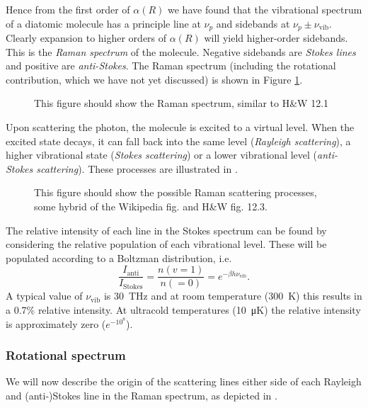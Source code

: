Hence from the first order of $\alpha(R)$ we have found that the vibrational
spectrum of a diatomic molecule has a principle line at $\nu_p$ and sidebands at
$\nu_p \pm \nu_\text{vib}$. Clearly expansion to higher orders of $\alpha(R)$
will yield higher-order sidebands. This is the \emph{Raman spectrum} of the
molecule. Negative sidebands are \emph{Stokes lines} and positive are
\emph{anti-Stokes}.
%
The Raman spectrum (including the rotational contribution, which we have not yet
discussed) is shown in Figure \ref{diaspec:fig:totalraman}.

\begin{figure}
  \caption{This figure should show the Raman spectrum, similar to H\&W 12.1}
  \label{diaspec:fig:totalraman}
\end{figure}

Upon scattering the photon, the molecule is excited to a virtual level. When the
excited state decays, it can fall back into the same level (\emph{Rayleigh
scattering}), a higher vibrational state (\emph{Stokes scattering}) or a lower
vibrational level (\emph{anti-Stokes scattering}). These processes are
illustrated in .

\begin{figure}
  \caption{This figure should show the possible Raman scattering processes, some
  hybrid of the Wikipedia fig. and H\&W fig. 12.3.}
  \label{diaspec:fig:ramanscatter}
\end{figure}

The relative intensity of each line in the Stokes spectrum can be found by
considering the relative population of each vibrational level. These will be
populated according to a Boltzman distribution, i.e.
%
\begin{equation}
  \frac{I_\text{anti}}{I_\text{Stokes}} = \frac{n(v=1)}{n(=0)} = e^{-\beta h
  \nu_\text{vib}}.
\end{equation}
%
A typical value of $\nu_\text{vib}$ is \SI{30}{\tera\hertz} and at room
temperature (\SI{300}{\kelvin}) this results in a 0.7\% relative intensity. At
ultracold temperatures (\SI{10}{\micro \kelvin}) the relative intensity is
approximately zero ($e^{- 10^8}$).

\subsubsection{Rotational spectrum}

We will now describe the origin of the scattering lines either side of each
Rayleigh and (anti-)Stokes line in the Raman spectrum, as depicted in
. 
